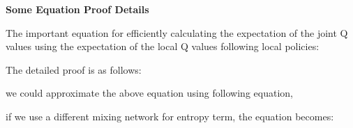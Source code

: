 \documentclass[runningheads]{llncs}
\begin{document}
{\bf Some Equation Proof Details}

The important equation for efficiently calculating the expectation of the joint Q values using the expectation of the local Q values following local policies:


The detailed proof is as follows:




we could approximate the above equation using following equation,




if we use a different mixing network for entropy term, the equation becomes:




\vspace{12pt}
\end{document}
